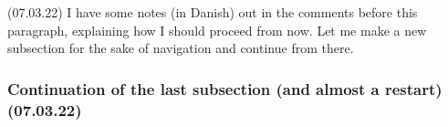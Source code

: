 \documentclass{report}
\begin{document}

(07.03.22) I have some notes (in Danish) out in the comments before this paragraph, explaining how I should proceed from now. Let me make a new subsection for the sake of navigation and continue from there.

\subsubsection{Continuation of the last subsection (and almost a restart) (07.03.22)}
\end{document}
